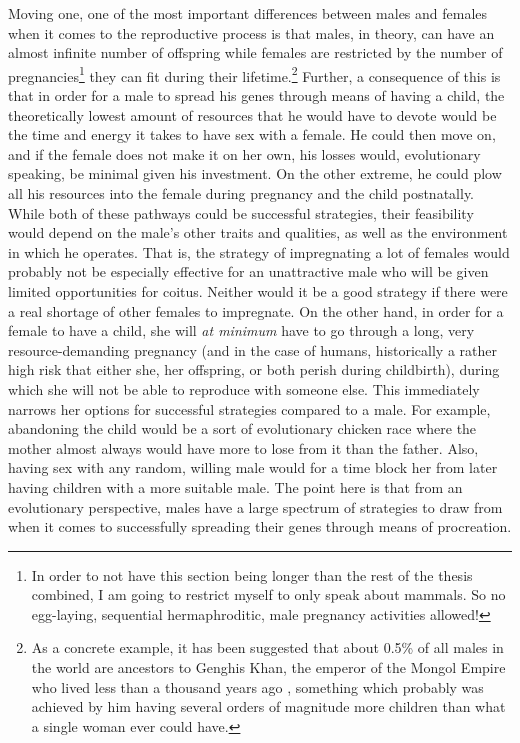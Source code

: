 Moving one, one of the most important differences between males and females when it comes to the reproductive process is that males, in theory, can have an almost infinite number of offspring while females are restricted by the number of pregnancies\footnote{In order to not have this section being longer than the rest of the thesis combined, I am going to restrict myself to only speak about mammals. So no egg-laying, sequential hermaphroditic, male pregnancy activities allowed!} they can fit during their lifetime.\footnote{As a concrete example, it has been suggested that about 0.5\% of all males in the world are ancestors to Genghis Khan, the emperor of the Mongol Empire who lived less than a thousand years ago \parencite{Zerjal2003}, something which probably was achieved by him having several orders of magnitude more children than what a single woman ever could have.} Further, a consequence of this is that in order for a male to spread his genes through means of having a child, the theoretically lowest amount of resources that he would have to devote would be the time and energy it takes to have sex with a female. He could then move on, and if the female does not make it on her own, his losses would, evolutionary speaking, be minimal given his investment. On the other extreme, he could plow all his resources into the female during pregnancy and the child postnatally. While both of these pathways could be successful strategies, their feasibility would depend on the male's other traits and qualities, as well as the environment in which he operates. That is, the strategy of impregnating a lot of females would probably not be especially effective for an unattractive male who will be given limited opportunities for coitus. Neither would it be a good strategy if there were a real shortage of other females to impregnate. On the other hand, in order for a female to have a child, she will \emph{at minimum} have to go through a long, very resource-demanding pregnancy (and in the case of humans, historically a rather high risk that either she, her offspring, or both perish during childbirth), during which she will not be able to reproduce with someone else. This immediately narrows her options for successful strategies compared to a male. For example, abandoning the child would be a sort of evolutionary chicken race where the mother almost always would have more to lose from it than the father. Also, having sex with any random, willing male would for a time block her from later having children with a more suitable male. The point here is that from an evolutionary perspective, males have a large spectrum of strategies to draw from when it comes to successfully spreading their genes through means of procreation.

